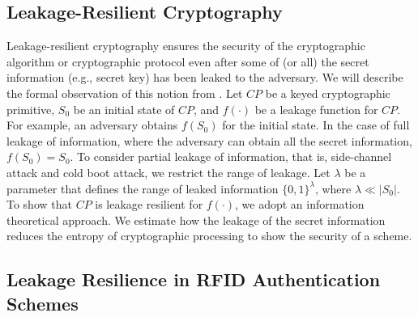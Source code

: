\documentclass[english]{llncs}
\begin{document}
\subsection{Leakage-Resilient Cryptography}

Leakage-resilient cryptography ensures the security of the cryptographic
algorithm or cryptographic protocol even after some of (or all) the
secret information (e.g., secret key) has been leaked to the adversary.
We will describe the formal observation of this notion from \cite{DP08}.
Let $CP$ be a keyed cryptographic primitive, $S_{0}$ be an initial
state of $CP$, and $f(\cdot)$ be a leakage function for $CP$. For
example, an adversary obtains $f(S_{0})$ for the initial state. In
the case of full leakage of information, where the adversary can obtain
all the secret information, $f(S_{0})=S_{0}$. To consider partial
leakage of information, that is, side-channel attack and cold boot
attack, we restrict the range of leakage. Let $\lambda$ be a parameter
that defines the range of leaked information $\{0,1\}^{\lambda}$,
where $\lambda\ll|S_{0}|$. To show that $CP$ is leakage resilient
for $f(\cdot)$, we adopt an information theoretical approach. We
estimate how the leakage of the secret information reduces the entropy
of cryptographic processing
to show the security of a scheme.


\subsection{Leakage Resilience in RFID Authentication Schemes}
\end{document}
